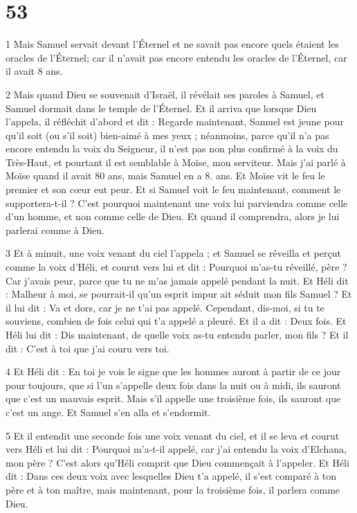 \chapter{53}

\par 1 Mais Samuel servait devant l'Éternel et ne savait pas encore quels étaient les oracles de l'Éternel; car il n'avait pas encore entendu les oracles de l'Éternel, car il avait 8 ans.

\par 2 Mais quand Dieu se souvenait d'Israël, il révélait ses paroles à Samuel, et Samuel dormait dans le temple de l'Éternel. Et il arriva que lorsque Dieu l'appela, il réfléchit d'abord et dit : Regarde maintenant, Samuel est jeune pour qu'il soit (ou s'il soit) bien-aimé à mes yeux ; néanmoins, parce qu'il n'a pas encore entendu la voix du Seigneur, il n'est pas non plus confirmé à la voix du Très-Haut, et pourtant il est semblable à Moïse, mon serviteur. Mais j'ai parlé à Moïse quand il avait 80 ans, mais Samuel en a 8. ans. Et Moïse vit le feu le premier et son cœur eut peur. Et si Samuel voit le feu maintenant, comment le supportera-t-il ? C’est pourquoi maintenant une voix lui parviendra comme celle d’un homme, et non comme celle de Dieu. Et quand il comprendra, alors je lui parlerai comme à Dieu.

\par 3 Et à minuit, une voix venant du ciel l'appela ; et Samuel se réveilla et perçut comme la voix d'Héli, et courut vers lui et dit : Pourquoi m'as-tu réveillé, père ? Car j'avais peur, parce que tu ne m'as jamais appelé pendant la nuit. Et Héli dit : Malheur à moi, se pourrait-il qu'un esprit impur ait séduit mon fils Samuel ? Et il lui dit : Va et dors, car je ne t'ai pas appelé. Cependant, dis-moi, si tu te souviens, combien de fois celui qui t'a appelé a pleuré. Et il a dit : Deux fois. Et Héli lui dit : Dis maintenant, de quelle voix as-tu entendu parler, mon fils ? Et il dit : C'est à toi que j'ai couru vers toi.

\par 4 Et Héli dit : En toi je vois le signe que les hommes auront à partir de ce jour pour toujours, que si l'un s'appelle deux fois dans la nuit ou à midi, ils sauront que c'est un mauvais esprit. Mais s'il appelle une troisième fois, ils sauront que c'est un ange. Et Samuel s'en alla et s'endormit.

\par 5 Et il entendit une seconde fois une voix venant du ciel, et il se leva et courut vers Héli et lui dit : Pourquoi m'a-t-il appelé, car j'ai entendu la voix d'Elchana, mon père ? C'est alors qu'Héli comprit que Dieu commençait à l'appeler. Et Héli dit : Dans ces deux voix avec lesquelles Dieu t'a appelé, il s'est comparé à ton père et à ton maître, mais maintenant, pour la troisième fois, il parlera comme Dieu.

